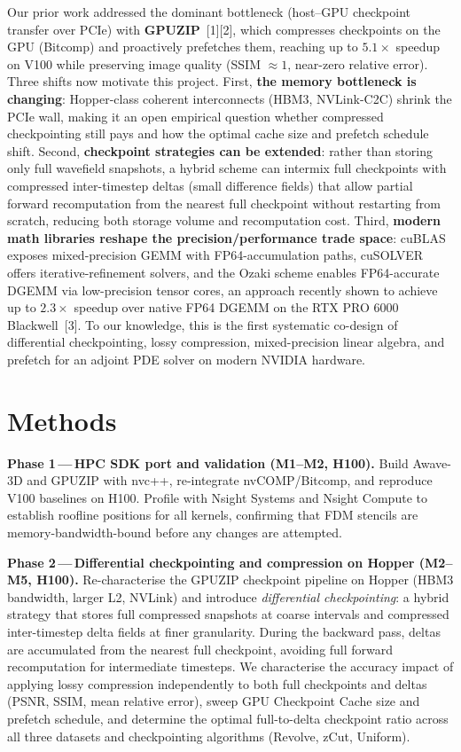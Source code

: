 \documentclass[11pt,a4paper]{article}
\newcommand{\gpuzip}{GPUZIP}
\begin{document}
Our prior work addressed the dominant bottleneck (host--GPU checkpoint transfer
over PCIe) with \textbf{\gpuzip}~[1][2], which compresses checkpoints on the GPU
(Bitcomp) and proactively prefetches them, reaching up to $5.1\times$ speedup on
V100 while preserving image quality (SSIM $\approx 1$, near-zero relative
error). Three shifts now motivate this project. First, \textbf{the memory
bottleneck is changing}: Hopper-class coherent interconnects (HBM3, NVLink-C2C)
shrink the PCIe wall, making it an open empirical question whether compressed
checkpointing still pays and how the optimal cache size and prefetch schedule
shift. Second, \textbf{checkpoint strategies can be extended}: rather than
storing only full wavefield snapshots, a hybrid scheme can intermix full
checkpoints with compressed inter-timestep deltas (small difference fields) that
allow partial forward recomputation from the nearest full checkpoint without
restarting from scratch, reducing both storage volume and recomputation cost.
Third, \textbf{modern math libraries reshape the precision/performance trade
space}: cuBLAS exposes mixed-precision GEMM with FP64-accumulation paths,
cuSOLVER offers iterative-refinement solvers, and the Ozaki scheme enables
FP64-accurate DGEMM via low-precision tensor cores, an approach recently shown
to achieve up to $2.3\times$ speedup over native FP64 DGEMM on the RTX PRO 6000
Blackwell~[3]. To our knowledge, this is the first systematic co-design of
differential checkpointing, lossy compression, mixed-precision linear algebra,
and prefetch for an adjoint PDE solver on modern NVIDIA hardware.

\section*{Methods}

\textbf{Phase 1\,---\,HPC SDK port and validation (M1--M2, H100).} Build
Awave-3D and \gpuzip{} with nvc++, re-integrate nvCOMP/Bitcomp, and reproduce
V100 baselines on H100. Profile with Nsight Systems and Nsight Compute to
establish roofline positions for all kernels, confirming that FDM stencils are
memory-bandwidth-bound before any changes are attempted.

\textbf{Phase 2\,---\,Differential checkpointing and compression on Hopper
(M2--M5, H100).} Re-characterise the \gpuzip{} checkpoint pipeline on Hopper
(HBM3 bandwidth, larger L2, NVLink) and introduce \emph{differential
checkpointing}: a hybrid strategy that stores full compressed snapshots at
coarse intervals and compressed inter-timestep delta fields at finer
granularity. During the backward pass, deltas are accumulated from the nearest
full checkpoint, avoiding full forward recomputation for intermediate
timesteps. We characterise the accuracy impact of applying lossy compression
independently to both full checkpoints and deltas (PSNR, SSIM, mean relative
error), sweep GPU Checkpoint Cache size and prefetch schedule, and determine the
optimal full-to-delta checkpoint ratio across all three datasets and
checkpointing algorithms (Revolve, zCut, Uniform).
\end{document}
